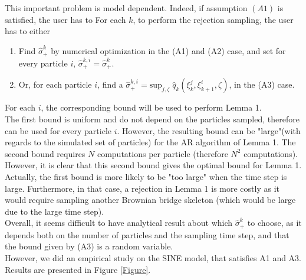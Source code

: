 \documentclass[12pt]{article}
\newcommand{\1}{\mathrm{1}}
\begin{document}
\begin{enumerate}
This important problem is model dependent. Indeed, if assumption $(A1)$ is satisfied, the user has to
For each $k$, to perform the rejection sampling, the user has to either
\begin{enumerate}
\item Find $\widehat{\sigma}_+^k$ by numerical optimization in the (A1) and (A2) case, and set for every particle $i$, $\widehat{\sigma}_+^{k, i } = \widehat{\sigma}_+^k$.
\item Or, for each particle $i$, find a $\widehat{\sigma}_+^{k, i } = \mathrm{sup}_{j,\zeta}\;\widehat{q}_k(\xi^j_k,\xi^i_{k+1},\zeta)$, in the (A3) case.
\end{enumerate}
For each $i$, the corresponding bound will be used to perform Lemma 1.\\
The first bound is uniform and do not depend on the particles sampled, therefore can be used for every particle $i$.  However, the resulting bound  can be "large"(with regards to the simulated set of particles) for the AR algorithm of Lemma 1.
The second bound requires $N$ computations per particle (therefore $N^2$ computations). However, it is clear that this second bound gives the optimal bound for Lemma 1.\\
Actually, the first bound is more likely to be "too large" when the time step is large. Furthermore, in that case, a rejection in Lemma 1 is more costly as it would require sampling another Brownian bridge skeleton (which would be large due to the large time step).\\
Overall, it seems difficult to have analytical result about which $\widehat{\sigma}_+^k$ to choose, as it depends both on the number of particles and the sampling time step, and that the bound given by (A3) is a random variable.\\
However, we did an empirical study on the SINE model, that satisfies A1 and A3. Results are presented in Figure \ref{Figure}.


\end{enumerate}
\end{document}
